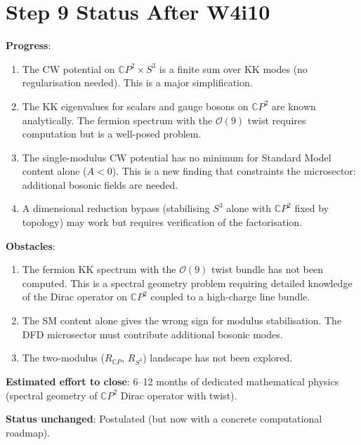 \documentclass[11pt,a4paper]{article}
\newcommand{\CP}{\mathbb{C}P}
\begin{document}
\section{Step 9 Status After W4i10}

\begin{tcolorbox}[colback=blue!5!white, colframe=blue!60!black,
  title=\textbf{Step 9 Assessment}]

\textbf{Progress}:
\begin{enumerate}[nosep]
\item The CW potential on $\CP^2 \times S^3$ is a finite sum over
  KK modes (no regularisation needed). This is a major simplification.
\item The KK eigenvalues for scalars and gauge bosons on $\CP^2$ are
  known analytically. The fermion spectrum with the $\mathcal{O}(9)$
  twist requires computation but is a well-posed problem.
\item The single-modulus CW potential has no minimum for Standard
  Model content alone ($A < 0$). This is a new finding that
  constraints the microsector: additional bosonic fields are needed.
\item A dimensional reduction bypass (stabilising $S^3$ alone with
  $\CP^2$ fixed by topology) may work but requires verification of
  the factorisation.
\end{enumerate}

\textbf{Obstacles}:
\begin{enumerate}[nosep]
\item The fermion KK spectrum with the $\mathcal{O}(9)$ twist bundle
  has not been computed. This is a spectral geometry problem requiring
  detailed knowledge of the Dirac operator on $\CP^2$ coupled to a
  high-charge line bundle.
\item The SM content alone gives the wrong sign for modulus
  stabilisation. The DFD microsector must contribute additional
  bosonic modes.
\item The two-modulus ($R_{\CP}$, $R_{S^3}$) landscape has not been
  explored.
\end{enumerate}

\textbf{Estimated effort to close}: 6--12 months of dedicated
mathematical physics (spectral geometry of $\CP^2$ Dirac operator
with twist).

\textbf{Status unchanged}: Postulated (but now with a concrete
computational roadmap).
\end{tcolorbox}
\end{document}

